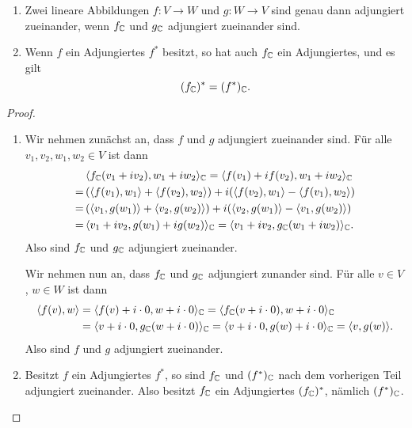 \documentclass[a4paper,10pt]{article}
\begin{document}
\begin{proposition}\label{prop: complexification has adjoints}
  \begin{enumerate}[leftmargin=*]
    \item
      Zwei lineare Abbildungen $f \colon V \to W$ und $g \colon W \to V$ sind genau dann adjungiert zueinander, wenn $f_{\mathbb{C}}$ und $g_{\mathbb{C}}$ adjungiert zueinander sind.
    \item
      Wenn $f$ ein Adjungiertes $f^*$ besitzt, so hat auch $f_{\mathbb{C}}$ ein Adjungiertes, und es gilt
      \[
        (f_{\mathbb{C}})^* = (f^*)_{\mathbb{C}}.
      \]
  \end{enumerate}
\end{proposition}


\begin{proof}
  \begin{enumerate}[leftmargin=*]
    \item
      Wir nehmen zunächst an, dass $f$ und $g$ adjungiert zueinander sind.
      Für alle $v_1, v_2, w_1, w_2 \in V$ ist dann
      \begin{align*}
        &\,  \langle  f_{\mathbb{C}}( v_1 + i v_2 ), w_1 + i w_2  \rangle_{\mathbb{C}}
        =     \langle  f(v_1) + i f(v_2), w_1 + i w_2 \rangle_{\mathbb{C}} \\
        =&\,  (\langle f(v_1), w_1 \rangle + \langle f(v_2), w_2 \rangle) + i(\langle f(v_2), w_1 \rangle - \langle f(v_1), w_2 \rangle) \\
        =&\,  (\langle v_1, g(w_1) \rangle + \langle v_2, g(w_2) \rangle) + i(\langle v_2, g(w_1) \rangle - \langle v_1, g(w_2) \rangle) \\
        =&\,  \langle  v_1 + i v_2, g(w_1) + i g(w_2)  \rangle_{\mathbb{C}}
        =     \langle  v_1 + i v_2, g_{\mathbb{C}}( w_1 + i w_2 )  \rangle_{\mathbb{C}}.
      \end{align*}
      Also sind $f_{\mathbb{C}}$ und $g_{\mathbb{C}}$ adjungiert zueinander.
      
      Wir nehmen nun an, dass $f_{\mathbb{C}}$ und $g_{\mathbb{C}}$ adjungiert zunander sind.
      Für alle $v \in V$, $w \in W$ ist dann
      \begin{align*}
            \langle f(v), w \rangle
        &=  \langle f(v) + i \cdot 0, w + i \cdot 0 \rangle_{\mathbb{C}}
         =  \langle f_{\mathbb{C}}(v + i \cdot 0), w + i \cdot 0 \rangle_{\mathbb{C}} \\
        &=  \langle v + i \cdot 0, g_{\mathbb{C}}(w + i \cdot 0) \rangle_{\mathbb{C}}
         =  \langle v + i \cdot 0, g(w) + i \cdot 0 \rangle_{\mathbb{C}}
         =  \langle v, g(w) \rangle.
      \end{align*}
      Also sind $f$ und $g$ adjungiert zueinander.
      
    \item
      Besitzt $f$ ein Adjungiertes $f^*$, so sind $f_{\mathbb{C}}$ und $(f^*)_{\mathbb{C}}$ nach dem vorherigen Teil adjungiert zueinander.
      Also besitzt $f_{\mathbb{C}}$ ein Adjungiertes $(f_{\mathbb{C}})^*$, nämlich $(f^*)_{\mathbb{C}}$.
  \end{enumerate}
\end{proof}
\end{document}
